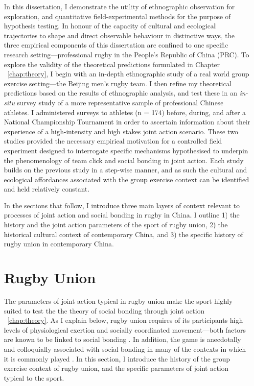 \begin{CJK}{UTF8}{gbsn}
In this dissertation, I demonstrate the utility of ethnographic observation for exploration, and quantitative field-experimental methods for the purpose of hypothesis testing.  In honour of the capacity of cultural and ecological trajectories to shape and direct observable behaviour in distinctive ways, the three empirical components of this dissertation are confined to one specific research setting---professional rugby in the People's Republic of China (PRC).   To explore the validity of the theoretical predictions formulated in Chapter ~\ref{chap:theory}, I begin with an in-depth ethnographic study of a real world group exercise setting---the Beijing men's rugby team.  I then refine my theoretical predictions based on the results of ethnographic analysis, and test these in an \textit{in-situ} survey study of a more representative sample of professional Chinese athletes. I administered surveys to athletes (n = 174) before, during, and after a National Championship Tournament in order to ascertain information about their experience of a high-intensity and high stakes joint action scenario.  These two studies provided the necessary empirical motivation for a controlled field experiment designed to interrogate specific mechanisms hypothesised to underpin the phenomenology of team click and social bonding in joint action.  Each study builds on the previous study in a step-wise manner, and as such the cultural and ecological affordances associated with the group exercise context can be identified and held relatively constant.

In the sections that follow, I introduce three main layers of context relevant to processes of joint action and social bonding in rugby in China.  I outline 1) the history and the joint action parameters of the sport of rugby union, 2) the historical cultural context of contemporary China, and 3) the specific history of rugby union in contemporary China.




\section{Rugby Union}




The parameters of joint action typical in rugby union make the sport highly suited to test the the theory of social bonding through joint action ~\ref{chap:theory}.  As I explain below, rugby union requires of its participants high levels of physiological exertion and socially coordinated movement---both factors are known to be linked to social bonding \citep{Cohen2017}. In addition, the game is anecdotally and colloquially associated with social bonding in many of the contexts in which it is commonly played \citep{Dunning2005}.  In this section, I introduce the history of the group exercise context of rugby union, and the specific parameters of joint action typical to the sport.


\end{CJK}
